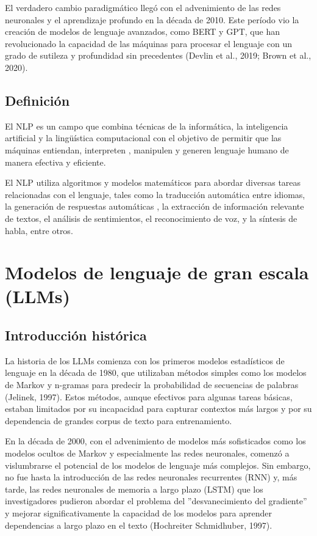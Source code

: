 El verdadero cambio paradigmático llegó con el advenimiento de las redes neuronales y el aprendizaje profundo
en la década de 2010.
Este período vio la creación de modelos de lenguaje avanzados, como BERT y GPT, que han revolucionado la capacidad de
las máquinas para procesar el lenguaje con un grado de sutileza y profundidad sin precedentes (Devlin et al., 2019;
Brown et al., 2020).

\subsection{Definición}
El NLP es un campo que combina técnicas de la informática, la inteligencia artificial y la lingüística computacional con
el objetivo de permitir que las máquinas entiendan, interpreten
, manipulen y generen lenguaje humano de manera efectiva y eficiente.

El NLP utiliza algoritmos y modelos matemáticos para abordar diversas tareas relacionadas con el lenguaje, tales como la
traducción automática entre idiomas, la generación de respuestas automáticas
, la extracción de información relevante de textos, el análisis de sentimientos, el reconocimiento de voz, y
la síntesis de habla, entre otros.


\section{Modelos de lenguaje de gran escala (LLMs)}

\subsection{Introducción histórica}
La historia de los LLMs comienza con los primeros modelos estadísticos de lenguaje en
la década de 1980, que utilizaban métodos simples como los modelos de Markov y n-gramas para predecir la probabilidad
de secuencias de palabras (Jelinek, 1997).
Estos métodos, aunque efectivos para algunas tareas básicas, estaban limitados por su incapacidad para capturar
contextos
más largos y por su dependencia de grandes corpus de texto para entrenamiento.

En la década de 2000, con el advenimiento de modelos más sofisticados como los modelos ocultos de Markov
y especialmente las redes neuronales, comenzó a vislumbrarse el
potencial de los modelos de lenguaje más complejos.
Sin embargo, no fue hasta la introducción de las redes neuronales recurrentes (RNN) y, más tarde, las redes neuronales
de memoria a largo plazo (LSTM)
que los investigadores pudieron abordar el problema del ''desvanecimiento del gradiente''
y mejorar significativamente la capacidad de los
modelos para aprender dependencias a largo plazo en el texto (Hochreiter Schmidhuber, 1997).


